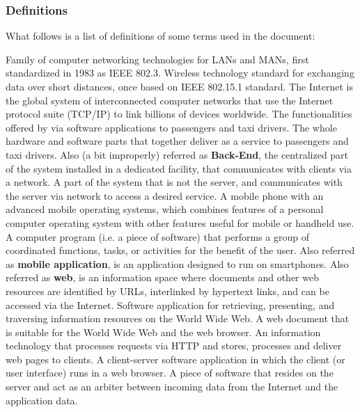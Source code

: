 \subsubsection{Definitions}
What follows is a list of definitions of some terms used in the document:
\begin{itemize}
	 Family of computer networking technologies for LANs and MANs, first standardized in 1983 as IEEE 802.3.
	 Wireless technology standard for exchanging data over short distances, once based on IEEE 802.15.1 standard.
	 The Internet is the global system of interconnected computer networks that use the Internet protocol suite (TCP/IP) to link billions of devices worldwide.
	 The functionalities offered by \myTaxiService{} via software applications to passengers and taxi drivers.
	 The whole hardware and software parts that together deliver \myTaxiService{} as a service to passengers and taxi drivers.
	 Also (a bit improperly) referred as \textbf{Back-End}, the centralized part of the system installed in a dedicated facility, that communicates with clients via a network.
	 A part of the system that is not the server, and communicates with the server via network to access a desired service.
	 A mobile phone with an advanced mobile operating systems, which combines features of a personal computer operating system with other features useful for mobile or handheld use.
	 A computer program (i.e. a piece of software) that performs a group of coordinated functions, tasks, or activities for the benefit of the user.
	 Also referred as \textbf{mobile application}, is an application designed to run on smartphones.
	 Also referred as \textbf{web}, is an information space where documents and other web resources are identified by URLs, interlinked by hypertext links, and can be accessed via the Internet.
	 Software application for retrieving, presenting, and traversing information resources on the World Wide Web.
	 A web document that is suitable for the World Wide Web and the web browser.
	 An information technology that processes requests via HTTP and stores, processes and deliver web pages to clients.
	 A client-server software application in which the client (or user interface) runs in a web browser.
	 A piece of software that resides on the server and act as an arbiter between incoming data from the Internet and the application data.
\end{itemize}

